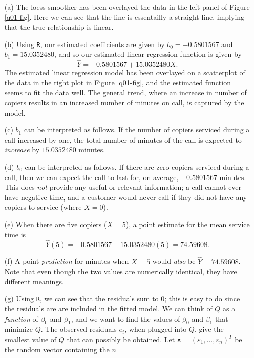 \documentclass[10pt]{article}
\begin{document}
\begin{itemize}
    \item[(a)] The loess smoother has been overlayed the data in the left panel of Figure \ref{q01-fig}. Here we 
    can see that the line is essentailly a straight line, implying that the true relationship is linear. 
    \item[(b)] Using \texttt{R}, our estimated coefficients are given by \(b_0 = -0.5801567\)
    and \(b_1 = 15.0352480\), and so our estimated linear regression function is given by
    \[\hat{Y} = -0.5801567 + 15.0352480 X.\] The estimated linear regression model has been 
    overlayed on a scatterplot of the data in the right plot in Figure \ref{q01-fig}, and the 
    estimated function seems to fit the data well. The general trend, where an increase in number of 
    copiers results in an increased number of minutes on call, is captured by the model.
    \item[(c)] \(b_1\) can be interpreted as follows. If the number of copiers serviced during
    a call increased by one, the total number of minutes of the call is expected to \textit{increase} by 
    \(15.0352480\) minutes. 
    \item[(d)] \(b_0\) can be interpreted as follows. If there are zero copiers serviced during 
    a call, then we can expect the call to last for, on average, \(-0.5801567 \) minutes. This does \textit{not}
    provide any useful or relevant information; a call cannot ever have negative time, and a customer would never
    call if they did not have any copiers to service (where \(X = 0\)).
    \item[(e)] When there are five copiers (\(X=5\)), a point estimate for the mean service time is 
    \[
        \hat{Y}(5) = -0.5801567 + 15.0352480(5) = 74.59608.
    \]
    \item[(f)] A point \textit{prediction} for minutes when \(X=5\) would \textit{also} be \(\hat{Y} = 74.59608\). Note that
    even though the two values are numerically identical, they have different meanings. 
    \item[(g)] Using \texttt{R}, we can see that the residuals sum to 0; this is easy to do since the residuals are
    are included in the fitted model. We can think of \(Q\) as a \textit{function} 
    of \(\beta_0\) and \(\beta_1\), and we want to find the values of \(\beta_0\) and \(\beta_1\) that minimize \(Q\).
    The observed residuals \(e_i\), when plugged into \(Q\), give the smallest value of \(Q\) that can possibly be obtained. 
    Let \(\bm{\varepsilon} = (\varepsilon_1, \ldots, \varepsilon_n)^T\) be the random vector containing the \(n\) 

\end{itemize}
\end{document}
